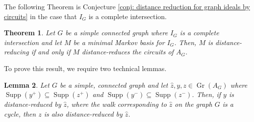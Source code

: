 \documentclass[a4paper, 12pt]{article}
\theoremstyle{plain}
\newtheorem{theorem}{Theorem}[section]
\newtheorem{lemma}[theorem]{Lemma}
\theoremstyle{definition}
\theoremstyle{remark}
\begin{document}



The following Theorem is Conjecture \ref{conj: distance reduction for graph ideals by circuits} in the case that $I_G$ is a complete intersection.

\begin{theorem} \label{thm:CImain}
    Let $G$ be a simple connected graph where $I_{G}$ is a complete intersection and let $M$ be a minimal Markov basis for $I_{G}$. Then, $M$ is distance-reducing if and only if $M$ distance-reduces the circuits of $A_G$.
\end{theorem}

To prove this result, we require two technical lemmas.

\begin{lemma} \label{lem:cycleDR}
    Let $G$ be a simple, connected graph and let $\hat z, y,z \in \operatorname{Gr}(A_G)$ where $\operatorname{Supp}(y^+) \subseteq \operatorname{Supp}(z^+)$ and $\operatorname{Supp}(y^-) \subseteq \operatorname{Supp}(z^-)$. Then, if $y$ is distance-reduced by $\hat z$, where the walk corresponding to $\hat z$ on the graph $G$ is a cycle, then $z$ is also distance-reduced by $\hat z$.
\end{lemma}
\end{document}
